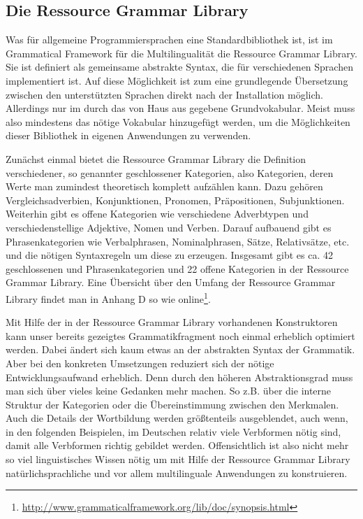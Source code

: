 \subsection{Die Ressource Grammar Library}
\label{subsec:rgl}
Was für allgemeine Programmiersprachen eine Standardbibliothek ist, ist im Grammatical Framework für die Multilingualität die Ressource Grammar Library. Sie ist definiert als gemeinsame abstrakte Syntax, die für verschiedenen Sprachen implementiert ist. Auf diese Möglichkeit ist zum eine grundlegende Übersetzung zwischen den unterstützten Sprachen direkt nach der Installation möglich. Allerdings nur im durch das von Haus aus gegebene Grundvokabular. Meist muss also mindestens das nötige Vokabular hinzugefügt werden, um die Möglichkeiten dieser Bibliothek in eigenen Anwendungen zu verwenden. \par
Zunächst einmal bietet die Ressource Grammar Library die Definition verschiedener, so genannter geschlossener Kategorien, also Kategorien, deren Werte man zumindest theoretisch komplett aufzählen kann. Dazu gehören Vergleichsadverbien, Konjunktionen, Pronomen, Präpositionen, Subjunktionen. Weiterhin gibt es offene Kategorien wie verschiedene Adverbtypen und verschiedenstellige Adjektive, Nomen und Verben. Darauf aufbauend gibt es Phrasenkategorien wie Verbalphrasen, Nominalphrasen, Sätze, Relativsätze, etc. und die nötigen Syntaxregeln um diese zu erzeugen. Insgesamt gibt es ca. 42 geschlossenen und Phrasenkategorien und 22 offene Kategorien in der Ressource Grammar Library. Eine Übersicht über den Umfang der Ressource Grammar Library findet man in \cite{RANTA2011} Anhang D so wie online\footnote{\url{http://www.grammaticalframework.org/lib/doc/synopsis.html}}. \par
Mit Hilfe der in der Ressource Grammar Library vorhandenen Konstruktoren kann unser bereits gezeigtes Grammatikfragment noch einmal erheblich optimiert werden. Dabei ändert sich kaum etwas an der abstrakten Syntax der Grammatik. Aber bei den konkreten Umsetzungen reduziert sich der nötige Entwicklungsaufwand erheblich. Denn durch den höheren Abstraktionsgrad muss man sich über vieles keine Gedanken mehr machen. So z.B. über die interne Struktur der Kategorien oder die Übereinstimmung zwischen den Merkmalen. Auch die Details der Wortbildung werden größtenteils ausgeblendet, auch wenn, in den folgenden Beispielen, im Deutschen relativ viele Verbformen nötig sind, damit alle Verbformen richtig gebildet werden. Offensichtlich ist also nicht mehr so viel linguistisches Wissen nötig um mit Hilfe der Ressource Grammar Library natürlichsprachliche und vor allem multilinguale Anwendungen zu konstruieren. \par
